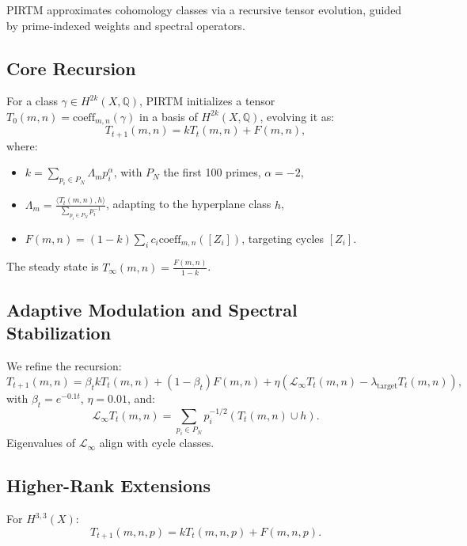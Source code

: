 \documentclass[11pt]{article}
\theoremstyle{plain}
\begin{document}
PIRTM approximates cohomology classes via a recursive tensor evolution, guided by prime-indexed weights and spectral operators.

\subsection{Core Recursion}
For a class \(\gamma \in H^{2k}(X, \mathbb{Q})\), PIRTM initializes a tensor \(T_0(m,n) = \text{coeff}_{m,n}(\gamma)\) in a basis of \(H^{2k}(X, \mathbb{Q})\), evolving it as:
\begin{equation}
T_{t+1}(m,n) = k T_t(m,n) + F(m,n),
\end{equation}
where:
\begin{itemize}
    \item \(k = \sum_{p_i \in P_N} \Lambda_m p_i^\alpha\), with \(P_N\) the first 100 primes, \(\alpha = -2\),
    \item \(\Lambda_m = \frac{\langle T_t(m,n), h \rangle}{\sum_{p_i \in P_N} p_i^{-1}}\), adapting to the hyperplane class \(h\),
    \item \(F(m,n) = (1-k) \sum_i c_i \text{coeff}_{m,n}([Z_i])\), targeting cycles \([Z_i]\).
\end{itemize}
The steady state is \(T_\infty(m,n) = \frac{F(m,n)}{1-k}\).

\subsection{Adaptive Modulation and Spectral Stabilization}
We refine the recursion:
\begin{equation}
T_{t+1}(m,n) = \beta_t k T_t(m,n) + (1-\beta_t) F(m,n) + \eta (\mathcal{L}_\infty T_t(m,n) - \lambda_{\text{target}} T_t(m,n)),
\end{equation}
with \(\beta_t = e^{-0.1 t}\), \(\eta = 0.01\), and:
\begin{equation}
\mathcal{L}_\infty T_t(m,n) = \sum_{p_i \in P_N} p_i^{-1/2} (T_t(m,n) \cup h).
\end{equation}
Eigenvalues of \(\mathcal{L}_\infty\) align with cycle classes.

\subsection{Higher-Rank Extensions}
For \(H^{3,3}(X)\):
\begin{equation}
T_{t+1}(m,n,p) = k T_t(m,n,p) + F(m,n,p).
\end{equation}
\end{document}

